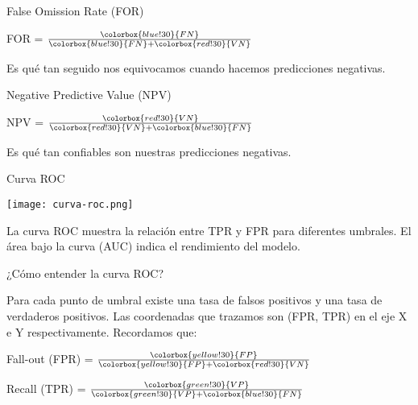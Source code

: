 \documentclass{beamer}
\begin{document}
\begin{frame}{False Omission Rate (FOR)}
    \begin{center}
    \Large FOR = $\frac{\colorbox{blue!30}{FN}}{\colorbox{blue!30}{FN} + \colorbox{red!30}{VN}}$
    \end{center}
    Es qué tan seguido nos equivocamos cuando hacemos predicciones negativas.
\end{frame}

\begin{frame}{Negative Predictive Value (NPV)}
    \begin{center}
    \Large NPV = $\frac{\colorbox{red!30}{VN}}{\colorbox{red!30}{VN} + \colorbox{blue!30}{FN}}$
    \end{center}
    Es qué tan confiables son nuestras predicciones negativas.
\end{frame}

\begin{frame}{Curva ROC}
    \begin{center}
    \texttt{[image: curva-roc.png]}
    \end{center}

    La curva ROC muestra la relación entre TPR y FPR para diferentes umbrales. El área bajo la curva (AUC) indica el rendimiento del modelo.
\end{frame}

\begin{frame}{¿Cómo entender la curva ROC?}

    Para cada punto de umbral existe una tasa de falsos positivos y una tasa de verdaderos positivos. Las coordenadas que trazamos son (FPR, TPR) en el eje X e Y respectivamente. Recordamos que:

    \vspace{1em}

    \begin{center}
    Fall-out (FPR) = $\frac{\colorbox{yellow!30}{FP}}{\colorbox{yellow!30}{FP} + \colorbox{red!30}{VN}}$

    Recall (TPR) = $\frac{\colorbox{green!30}{VP}}{\colorbox{green!30}{VP} + \colorbox{blue!30}{FN}}$
    \end{center}
\end{frame}
\end{document}
